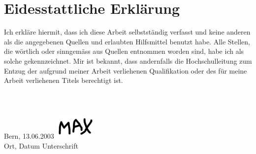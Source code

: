 \section*{Eidesstattliche Erklärung}
Ich erkläre hiermit, dass ich diese Arbeit selbstständig verfasst und keine anderen als die angegebenen Quellen und erlaubten Hilfsmittel benutzt habe. Alle Stellen, die wörtlich oder sinngemäss aus Quellen entnommen worden sind, habe ich als solche gekennzeichnet. Mir ist bekannt, dass andernfalls die Hochschulleitung zum Entzug der aufgrund meiner Arbeit verliehenen Qualifikation oder des für meine Arbeit verliehenen Titels berechtigt ist.\\
\\
\\
\\
Bern, 13.06.2003 \hfill \includegraphics[width=2cm]{content/00_assets/unterschrift.png}\\
Ort, Datum \hfill Unterschrift